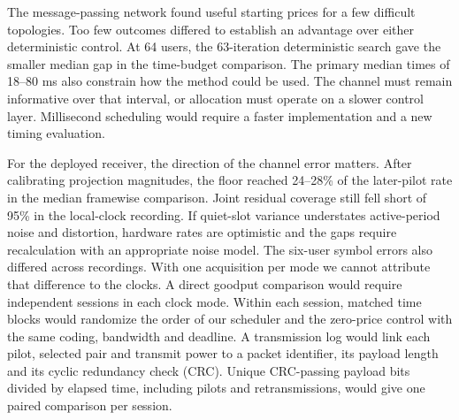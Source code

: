 The message-passing network found useful starting prices for a few difficult topologies. Too few outcomes differed to establish an advantage over either deterministic control. At 64 users, the 63-iteration deterministic search gave the smaller median gap in the time-budget comparison. The primary median times of 18--80 ms also constrain how the method could be used. The channel must remain informative over that interval, or allocation must operate on a slower control layer. Millisecond scheduling would require a faster implementation and a new timing evaluation.

For the deployed receiver, the direction of the channel error matters. After calibrating projection magnitudes, the floor reached 24--28\% of the later-pilot rate in the median framewise comparison. Joint residual coverage still fell short of 95\% in the local-clock recording. If quiet-slot variance understates active-period noise and distortion, hardware rates are optimistic and the gaps require recalculation with an appropriate noise model. The six-user symbol errors also differed across recordings. With one acquisition per mode we cannot attribute that difference to the clocks. A direct goodput comparison would require independent sessions in each clock mode. Within each session, matched time blocks would randomize the order of our scheduler and the zero-price control with the same coding, bandwidth and deadline. A transmission log would link each pilot, selected pair and transmit power to a packet identifier, its payload length and its cyclic redundancy check (CRC). Unique CRC-passing payload bits divided by elapsed time, including pilots and retransmissions, would give one paired comparison per session.
